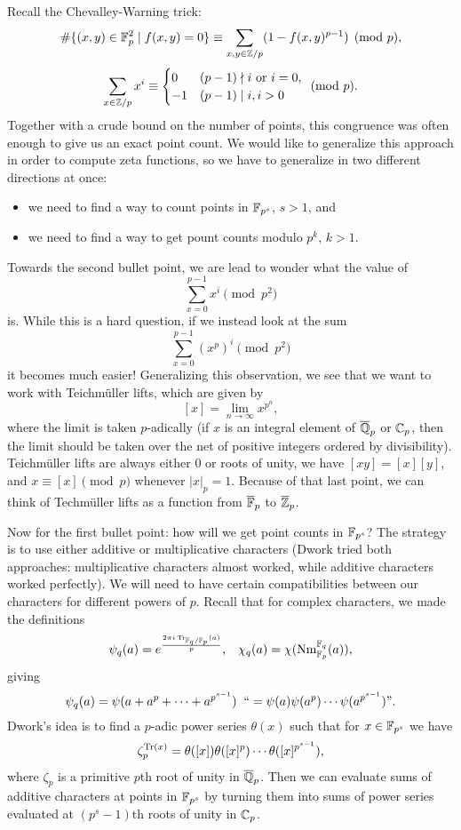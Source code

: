 Recall the Chevalley-Warning trick:
\[
\#\{(x,y) \in \mathbb{F}_p^2 \mid f(x,y) = 0\} \equiv \sum_{x,y \in \mathbb{Z}/p} (1 - f(x,y)^{p-1}) \pmod{p},
\]
\[
\sum_{x\in\mathbb{Z}/p} x^i \equiv \begin{cases}0 & (p-1)\nmid i \text{ or } i = 0,\\ -1 & (p-1)\mid i, i > 0\end{cases} \pmod{p}.
\]
Together with a crude bound on the number of points, this congruence was often enough to give us an exact point count. We would like to generalize this approach in order to compute zeta functions, so we have to generalize in two different directions at once:
\begin{itemize}
\item we need to find a way to count points in $\mathbb{F}_{p^s}$, $s > 1$, and
\item we need to find a way to get pount counts modulo $p^k$, $k > 1$.
\end{itemize}
Towards the second bullet point, we are lead to wonder what the value of
\[
\sum_{x=0}^{p-1} x^i \pmod{p^2}
\]
is. While this is a hard question, if we instead look at the sum
\[
\sum_{x=0}^{p-1} (x^p)^i \pmod{p^2}
\]
it becomes much easier! Generalizing this observation, we see that we want to work with Teichm\"uller lifts, which are given by
\[
[x] = \lim_{n\rightarrow \infty} x^{p^n},
\]
where the limit is taken $p$-adically (if $x$ is an integral element of $\overline{\mathbb{Q}}_p$ or $\mathbb{C}_p$, then the limit should be taken over the net of positive integers ordered by divisibility). Teichm\"uller lifts are always either $0$ or roots of unity, we have $[xy] = [x][y]$, and $x \equiv [x] \pmod{p}$ whenever $|x|_p = 1$. Because of that last point, we can think of Techm\"uller lifts as a function from $\overline{\mathbb{F}}_p$ to $\overline{\mathbb{Z}}_p$.

Now for the first bullet point: how will we get point counts in $\mathbb{F}_{p^s}$? The strategy is to use either additive or multiplicative characters (Dwork tried both approaches: multiplicative characters almost worked, while additive characters worked perfectly). We will need to have certain compatibilities between our characters for different powers of $p$. Recall that for complex characters, we made the definitions
\[
\psi_q(a) = e^{\frac{2\pi i\operatorname{Tr}_{\mathbb{F}_q/\mathbb{F}_p}(a)}{p}},\;\;\; \chi_q(a) = \chi(\operatorname{Nm}^{\mathbb{F}_q}_{\mathbb{F}_p}(a)),
\]
giving
\[
\psi_q(a) = \psi(a+a^p + \cdots + a^{p^{s-1}})\;\; ``=\psi(a)\psi(a^p)\cdots \psi(a^{p^{s-1}})".
\]
Dwork's idea is to find a $p$-adic power series $\theta(x)$ such that for $x \in \mathbb{F}_{p^s}$ we have
\[
\zeta_p^{\operatorname{Tr}(x)} = \theta([x])\theta([x]^p)\cdots \theta([x]^{p^{s-1}}),
\]
where $\zeta_p$ is a primitive $p$th root of unity in $\overline{\mathbb{Q}}_p$. Then we can evaluate sums of additive characters at points in $\mathbb{F}_{p^s}$ by turning them into sums of power series evaluated at $(p^s-1)$th roots of unity in $\mathbb{C}_p$.

